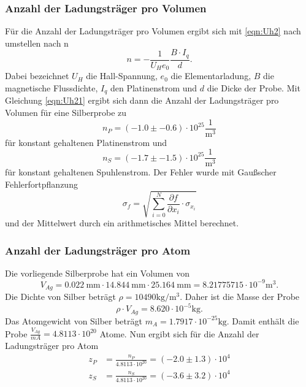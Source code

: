     \subsubsection{Anzahl der Ladungsträger pro Volumen}
    \label{sec:ladtrprovol}
        Für die Anzahl der Ladungsträger pro Volumen ergibt sich mit \ref{eqn:Uh2} nach umstellen nach n
        \begin{equation}
            n=-\frac{1}{U_{H} e_0}\frac{B\cdot I_q}{d}. \label{eqn:Uh21}
          \end{equation}
          Dabei bezeichnet $U_{H}$ die Hall-Spannung, $e_{0}$ die Elementarladung, $B$ die magnetische Flussdichte, $I_{q}$ den Platinenstrom und $d$ die Dicke
          der Probe. Mit Gleichung \ref{eqn:Uh21} ergibt sich dann die Anzahl der Ladungsträger pro Volumen für eine Silberprobe zu
          \begin{equation}
            n_{P} = (-1.0 \pm -0.6) \cdot 10^{25} \frac{1}{\si{\cubic\meter}}
          \end{equation}
          für konstant gehaltenen Platinenstrom und
          \begin{equation}
            n_{S} = (-1.7 \pm -1.5) \cdot 10^{25} \frac{1}{\si{\cubic\meter}}
          \end{equation}
        für konstant gehaltenen Spuhlenstrom.
        Der Fehler wurde mit Gaußscher Fehlerfortpflanzung
        \begin{equation}
          \sigma_f = \sqrt{\sum_{i=0}^{N} {\frac{\partial f}{\partial x_i} \cdot \sigma_{x_i}}}
          \label{eqn:gauss}
        \end{equation}
        und der Mittelwert durch ein arithmetisches Mittel berechnet.
    \subsubsection{Anzahl der Ladungsträger pro Atom}
       Die vorliegende Silberprobe hat ein Volumen von
       \begin{equation*}
         V_{Ag} = \SI{0.022}{\milli\meter} \cdot \SI{14.844}{\milli\meter} \cdot \SI{25.164}{\milli\meter} = 8.21775715 \cdot 10^{-9} \si{\cubic\meter}.
       \end{equation*}
       Die Dichte von Silber beträgt $\rho = 10490 \si{\kilo\gram\per\cubic\meter}$. Daher ist die Masse der Probe
       \begin{equation*}
         \rho \cdot V_{Ag} = 8.620 \cdot 10^{-5} \si{\kilo\gram}.
       \end{equation*}
       Das Atomgewicht von Silber beträgt $m_{A} = 1.7917 \cdot 10^{-25} \si{\kilo\gram}$.
       Damit enthält die Probe $\frac{V_{Ag}}{m{A}} = 4.8113 \cdot 10^{20}$ Atome.
       Nun ergibt sich für die Anzahl der Ladungsträger pro Atom
       \begin{align}
         z_{P} & = \frac{n_{P}}{4.8113 \cdot 10^{20}} = (-2.0 \pm 1.3)\cdot 10^{4} \\
         z_{S} & = \frac{n_{S}}{4.8113 \cdot 10^{20}} = (-3.6 \pm 3.2)\cdot 10^{4}
       \end{align}
